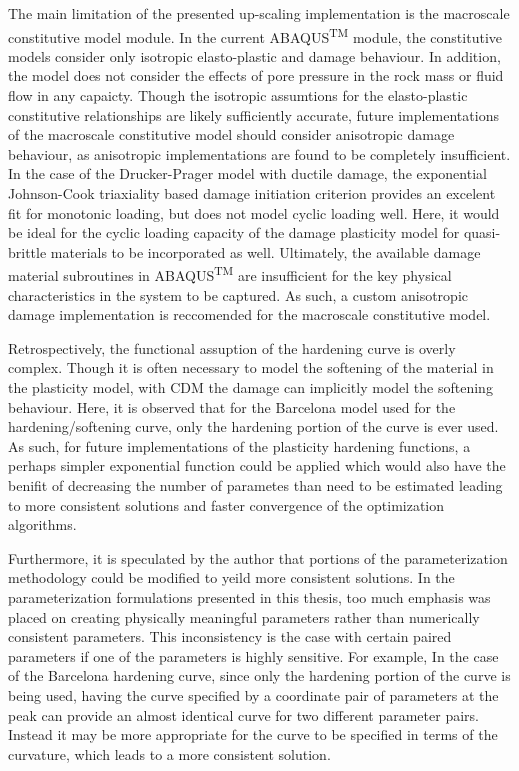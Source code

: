 The main limitation of the presented up-scaling implementation is the macroscale constitutive model module. In the current ABAQUS\textsuperscript{TM} module, the constitutive models consider only isotropic elasto-plastic and damage behaviour. In addition, the model does not consider the effects of pore pressure in the rock mass or fluid flow in any capaicty. Though the isotropic assumtions for the elasto-plastic constitutive relationships are likely sufficiently accurate, future implementations of the macroscale constitutive model should consider anisotropic damage behaviour, as anisotropic implementations are found to be completely insufficient. In the case of the Drucker-Prager model with ductile damage, the exponential Johnson-Cook triaxiality based damage initiation criterion provides an excelent fit for monotonic loading, but does not model cyclic loading well. Here, it would be ideal for the cyclic loading capacity of the damage plasticity model for quasi-brittle materials to be incorporated as well. Ultimately, the available damage material subroutines in ABAQUS\textsuperscript{TM} are insufficient for the key physical characteristics in the system to be captured. As such, a custom anisotropic damage implementation is reccomended for the macroscale constitutive model.

Retrospectively, the functional assuption of the hardening curve is overly complex. Though it is often necessary to model the softening of the material in the plasticity model, with CDM the damage can implicitly model the softening behaviour. Here, it is observed that for the Barcelona model used for the hardening/softening curve, only the hardening portion of the curve is ever used. As such, for future implementations of the plasticity hardening functions, a perhaps simpler exponential function could be applied which would also have the benifit of decreasing the number of parametes than need to be estimated leading to more consistent solutions and faster convergence of the optimization algorithms. 

Furthermore, it is speculated by the author that portions of the parameterization methodology could be modified to yeild more consistent solutions. In the parameterization formulations presented in this thesis, too much emphasis was placed on creating physically meaningful parameters rather than numerically consistent parameters. This inconsistency is the case with certain paired parameters if one of the parameters is highly sensitive. For example, In the case of the Barcelona hardening curve, since only the hardening portion of the curve is being used, having the curve specified by a coordinate pair of parameters at the peak can provide an almost identical curve for two different parameter pairs. Instead it may be more appropriate for the curve to be specified in terms of the curvature, which leads to a more consistent solution.

